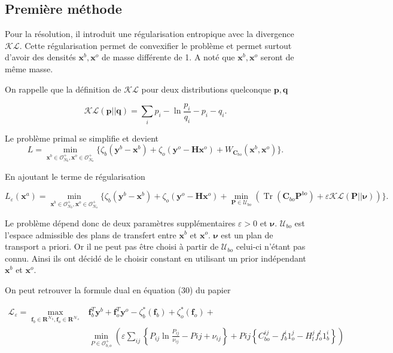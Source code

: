 \documentclass{article}
\newcommand{\bH}{\bm{H}}
\newcommand{\bbf}{\bm{f}}
\newcommand{\bnu}{\bm{\nu}}
\newcommand{\bR}{\bm{R}}
\newcommand{\bC}{\bm{C}}
\newcommand{\bx}{\bm{x}}
\newcommand{\bP}{\bm{P}}
\newcommand{\by}{\bm{y}}
\DeclareMathOperator{\Tr}{Tr}
\begin{document}
\subsection{Première méthode}
Pour la résolution, il introduit une régularisation entropique avec la divergence $\mathcal{KL}$. Cette régularisation permet de convexifier le problème et permet surtout d'avoir des densités $\bx^b, \bx^o$ de masse différente de 1. A noté que $\bx^b, \bx^o$ seront de même masse.

On rappelle que la définition de $\mathcal{KL}$ pour deux distributions quelconque $\bm{p}, \bm{q}$

$$
    \mathcal{KL}(\bm{p}||\bm{q}) = \sum_i p_i - \ln{\frac{p_i}{q_i}} - p_i - q_i .
$$

Le problème primal se simplifie et devient
$$
    L = \min_{\bx^b \in \mathcal O_{N_b}^+, \bx^o \in \mathcal O_{N_o}^+} \{\zeta_b(\by^b - \bx^b) + \zeta_o(\by^o - \bH \bx^o) + W_{\bC_{bo}}(\bx^b,\bx^o)\}.
$$

En ajoutant le terme de régularisation

$$
    L_\varepsilon(\bx^a) = \min_{\bx^b \in \mathcal O_{N_b}^+, \bx^o \in \mathcal O_{N_o}^+} \{\zeta_b(\by^b - \bx^b) + \zeta_o(\by^o - \bH \bx^o) + \min_{\bP \in \mathcal U_{bo}} \left(\Tr(\bC_{bo} \bP^{bo}) + \varepsilon \mathcal{KL(\bP || \bnu)}\right) \}.
$$

Le problème dépend donc de deux paramètres supplémentaires $\varepsilon > 0$ et $\bnu$. $\mathcal U_{bo}$ est l'espace admissible des plans de transfert entre $\bx^b$ et $\bx^o$. $\bnu$ est un plan de transport a priori. Or il ne peut pas être choisi à partir de $\mathcal{U}_{bo}$ celui-ci n'étant pas connu. Ainsi ils ont décidé de le choisir constant en utilisant un prior indépendant $\bx^b$ et $\bx^o$.

On peut retrouver la formule dual en équation (30) du papier

\begin{equation*}
    \begin{split}
        \mathcal L_{\varepsilon} = \max_{\bbf_b \in \bR^{\mathcal N_b}, \bbf_o \in \bR^{\mathcal N_o}} &  \bbf_b^T \by^b + \bbf_o^T \by^o - \zeta^*_b(\bbf_b) + \zeta^*_o(\bbf_o) + \\  &\min_{P \in \mathcal{O}^+_{b,o}}\left(\varepsilon \sum_{ij} \left\{P_{ij} \ln{\frac{P_{ij}}{\nu_{ij}} - P{ij} + \nu_{ij}}\right\} + P{ij} \left\{C_{bo}^{ij} - f_b^i 1_o^j - H_l^j f_o^l 1_b^i \right\}\right)
    \end{split}
\end{equation*}
\end{document}
